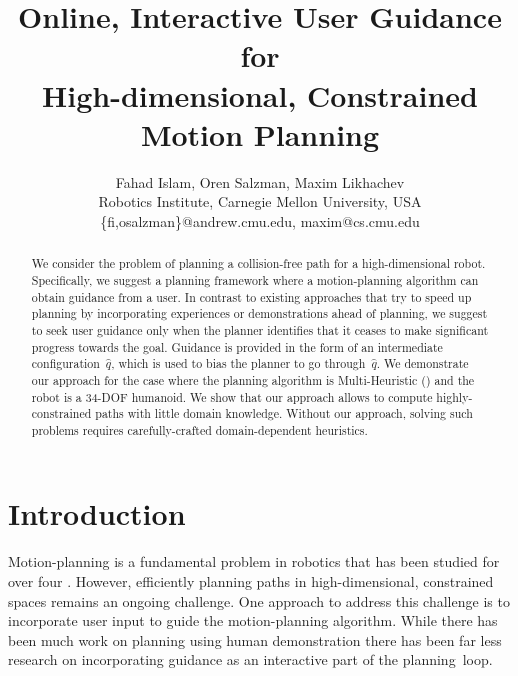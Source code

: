 \documentclass{article}
\title{	Online, Interactive User Guidance for \\
		High-dimensional, Constrained Motion Planning }
\author{
Fahad Islam,
Oren Salzman,
Maxim Likhachev
\\
Robotics Institute, Carnegie Mellon University, USA\\
%
\{fi,osalzman\}@andrew.cmu.edu,
maxim@cs.cmu.edu
}
\begin{document}
\maketitle
\thispagestyle{empty}
\pagestyle{empty}


\begin{abstract}
We consider the problem of planning a collision-free path for a high-dimensional robot.
Specifically, we suggest a planning framework where a motion-planning algorithm can obtain guidance from a user.
In contrast to existing approaches that try to speed up planning by incorporating experiences or demonstrations ahead of planning, 
we suggest to seek user guidance only when the planner identifies that it ceases to make significant progress towards the goal.
Guidance is provided in the form of an intermediate configuration~$\hat{q}$, which is used to bias the planner to go through~$\hat{q}$.
We demonstrate our approach for the case where the planning algorithm is Multi-Heuristic \astar (\mhastar) and the robot is a 34-DOF humanoid.
We show that our approach allows to compute highly-constrained paths with little domain knowledge.
Without our approach, solving such problems requires carefully-crafted domain-dependent heuristics. 
\end{abstract}



\section{Introduction}
\label{sec:intro}

Motion-planning is a fundamental problem in robotics that has been studied for over four .
However, efficiently planning paths in high-dimensional, constrained spaces remains an ongoing challenge.
One approach to address this challenge is to incorporate user input to guide the motion-planning algorithm.
While there has been much work on planning using human demonstration 
there has been far less research on incorporating guidance as an interactive part of the planning~loop.
\end{document}
